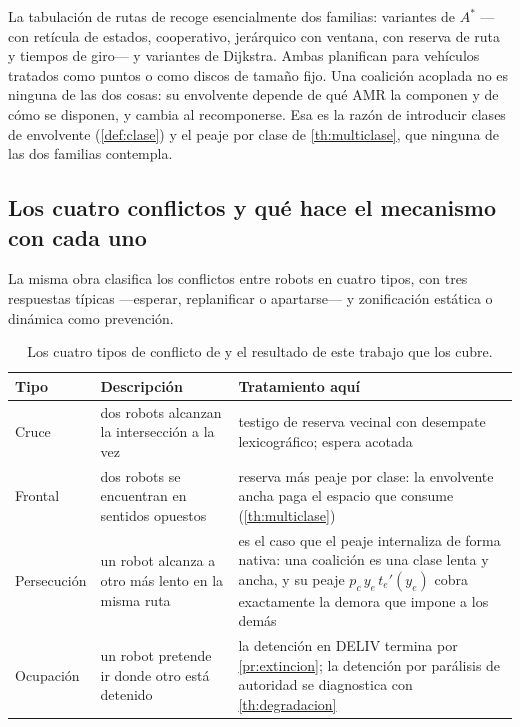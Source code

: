 \begin{observacion}
\label{obs:rutas-lit}
La tabulación de rutas de \cite{yildirim2023warehouse} recoge esencialmente dos
familias: variantes de $A^{\!*}$ —con retícula de estados, cooperativo,
jerárquico con ventana, con reserva de ruta y tiempos de giro— y variantes de
Dijkstra. Ambas planifican para vehículos tratados como puntos o como discos de
tamaño fijo. Una coalición acoplada no es ninguna de las dos cosas: su
envolvente depende de qué AMR la componen y de cómo se disponen, y cambia al
recomponerse. Esa es la razón de introducir clases de envolvente
(\cref{def:clase}) y el peaje por clase de \cref{th:multiclase}, que ninguna de
las dos familias contempla.
\end{observacion}

\subsection{Los cuatro conflictos y qué hace el mecanismo con cada uno}

La misma obra clasifica los conflictos entre robots en cuatro tipos, con tres
respuestas típicas —esperar, replanificar o apartarse— y zonificación estática o
dinámica como prevención.

\begin{table}[!ht]
\centering\small
\caption{Los cuatro tipos de conflicto de \cite{yildirim2023warehouse} y el
resultado de este trabajo que los cubre.}
\label{tab:conflictos}
\begin{tabularx}{\textwidth}{@{}p{2.5cm}p{4.3cm}X@{}}
\toprule
Tipo & Descripción & Tratamiento aquí \\
\midrule
Cruce & dos robots alcanzan la intersección a la vez
  & testigo de reserva vecinal con desempate lexicográfico; espera acotada \\
Frontal & dos robots se encuentran en sentidos opuestos
  & reserva más peaje por clase: la envolvente ancha paga el espacio que
    consume (\cref{th:multiclase}) \\
Persecución & un robot alcanza a otro más lento en la misma ruta
  & es el caso que el peaje internaliza de forma nativa: una coalición es una
    clase lenta y ancha, y su peaje $p_c\,y_e\,t_e'(y_e)$ cobra exactamente la
    demora que impone a los demás \\
Ocupación & un robot pretende ir donde otro está detenido
  & la detención en \textsf{DELIV} termina por \cref{pr:extincion}; la
    detención por parálisis de autoridad se diagnostica con
    \cref{th:degradacion} \\
\bottomrule
\end{tabularx}
\end{table}

